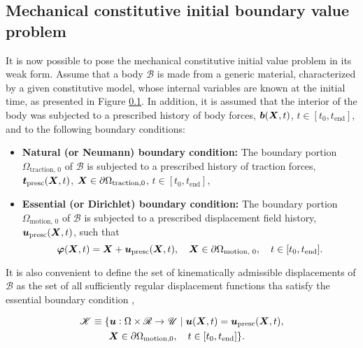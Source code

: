 \subsection{Mechanical constitutive initial boundary value problem}

It is now possible to pose the mechanical constitutive initial value problem in its weak form.
Assume that a body $\mathscr{B}$ is made from a generic material, characterized by a given constitutive model, whose internal variables are known at the initial time, as presented in Figure \ref{}.
In addition, it is assumed that the interior of the body was subjected to a prescribed history of body forces, $\bm{b}(\bm X, t)$, $t\in[t_0, t_\text{end}]$, and to the following boundary conditions:
\begin{itemize}
    \item \textbf{Natural (or Neumann) boundary condition:}
    The boundary portion $\Omega_\text{traction, 0}$ of $\mathscr{B}$ is subjected to a prescribed history of traction forces, $\bm{t}_\text{presc}(\bm{X}, t)$, $\bm{X}\in \partial \Omega_\text{traction,0}$, $t\in[t_0, t_\text{end}]$,\\
    \item \textbf{Essential (or Dirichlet) boundary condition:}
    The boundary portion $\Omega_\text{motion, 0}$ of $\mathscr{B}$ is subjected to a prescribed displacement field history, $\bm{u}_\text{presc}(\bm{X}, t)$, such that $$\bm{\varphi}(\bm{X}, t) = \bm{X} + \bm{u}_\text{presc}(\bm{X}, t),\quad \bm{X}\in \partial\Omega_\text{motion, 0},\quad t\in[t_0, t_\text{end}].$$
\end{itemize}

It is also convenient to define the set of kinematically admissible displacements of $\mathscr{B}$ as the set of all sufficiently regular displacement functions tha satisfy the essential boundary condition \citep{de2011computational},
\begin{highlight}[innertopmargin=-5pt]
    \begin{multline}
        \mathscr{K}\equiv \{\bm{u}:\Omega\times \mathscr{R}\to \mathscr{U}\;|\;\bm{u}(\bm{X},t) = \bm{u}_\text{presc} (\bm{X},t),\\ \bm{X}\in\partial \Omega_\text{motion,0},\quad t\in [t_0,t_\text{end}]\}.\quad
    \end{multline}
\end{highlight}

